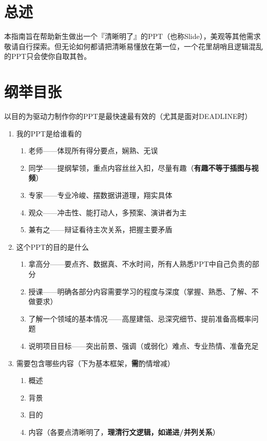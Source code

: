 \part[总述]{总述}
本指南旨在帮助新生做出一个『清晰明了』的PPT（也称Slide），美观等其他需求敬请自行探索。但无论如何都请把清晰易懂放在第一位，一个花里胡哨且逻辑混乱的PPT只会使你自取其咎。

\part[纲举目张]{纲举目张}
以目的为驱动力制作你的PPT是最快速最有效的（尤其是面对DEADLINE时）
\begin{enumerate}
    \item 我的PPT是给谁看的
          \begin{enumerate}
              \item 老师——体现所有得分要点，娴熟、无误
              \item 同学——提纲挈领，重点内容丝丝入扣，尽量有趣（\textbf{有趣不等于插图与视频}）
              \item 专家——专业冷峻、摆数据讲道理，翔实具体
              \item 观众——冲击性、能打动人，多预案、演讲者为主
              \item 兼有之——辩证看待主次关系，把握主要矛盾
          \end{enumerate}
    \item 这个PPT的目的是什么
          \begin{enumerate}
              \item 拿高分——要点齐、数据真、不水时间，所有人熟悉PPT中自己负责的部分
              \item 授课——明确各部分内容需要学习的程度与深度（掌握、熟悉、了解、不做要求）
              \item 了解一个领域的基本情况——高屋建瓴、忌深究细节、提前准备高概率问题
              \item 说明项目目标——突出前景、强调（或弱化）难点、专业热情、准备充足
          \end{enumerate}
    \item 需要包含哪些内容（下为基本框架，\textbf{需}酌情增减）
          \begin{enumerate}
              \item 概述
              \item 背景
              \item 目的
              \item 内容（各要点清晰明了，\textbf{理清行文逻辑，如递进/并列关系}）

\end{enumerate}
\end{enumerate}
